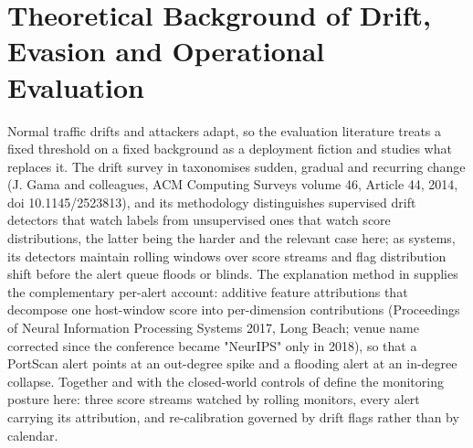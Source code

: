 \section{Theoretical Background of Drift, Evasion and Operational Evaluation}

Normal traffic drifts and attackers adapt, so the evaluation literature treats a fixed threshold on a fixed background as a deployment fiction and studies what replaces it. The drift survey in \cite{k28} taxonomises sudden, gradual and recurring change (J. Gama and colleagues, ACM Computing Surveys volume 46, Article 44, 2014, doi 10.1145/2523813), and its methodology distinguishes supervised drift detectors that watch labels from unsupervised ones that watch score distributions, the latter being the harder and the relevant case here; as systems, its detectors maintain rolling windows over score streams and flag distribution shift before the alert queue floods or blinds. The explanation method in \cite{k29} supplies the complementary per-alert account: additive feature attributions that decompose one host-window score into per-dimension contributions (Proceedings of Neural Information Processing Systems 2017, Long Beach; venue name corrected since the conference became "NeurIPS" only in 2018), so that a PortScan alert points at an out-degree spike and a flooding alert at an in-degree collapse. Together \cite{k28} and \cite{k29} with the closed-world controls of \cite{k4} define the monitoring posture here: three score streams watched by rolling monitors, every alert carrying its attribution, and re-calibration governed by drift flags rather than by calendar.

